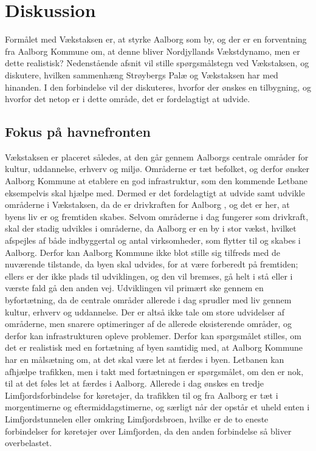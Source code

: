 \section{Diskussion}
 Formålet med Vækstaksen er, at styrke Aalborg som by, og der er en forventning fra Aalborg Kommune om, at denne bliver Nordjyllands Vækstdynamo, men er dette realistisk? Nedenstående afsnit vil stille spørgsmålstegn ved Vækstaksen, og diskutere, hvilken sammenhæng Strøybergs Palæ og Vækstaksen har med hinanden. I den forbindelse vil der diskuteres, hvorfor der ønskes en tilbygning, og hvorfor det netop er i dette område, det er fordelagtigt at udvide.

\subsection{Fokus på havnefronten}
Vækstaksen er placeret således, at den går gennem Aalborgs centrale områder for kultur, uddannelse, erhverv og miljø. Områderne er tæt befolket, og derfor ønsker Aalborg Kommune at etablere en god infrastruktur, som den kommende Letbane eksempelvis skal hjælpe med. Dermed er det fordelagtigt at udvide samt udvikle områderne i Vækstaksen, da de er drivkraften for Aalborg \citep{bedreoverblik}, og det er her, at byens liv er og fremtiden skabes. Selvom områderne i dag fungerer som drivkraft, skal der stadig udvikles i områderne, da Aalborg er en by i stor vækst, hvilket afspejles af både indbyggertal og antal virksomheder, som flytter til og skabes i Aalborg. Derfor kan Aalborg Kommune ikke blot stille sig tilfreds med de nuværende tilstande, da byen skal udvides, for at være forberedt på fremtiden; ellers er der ikke plads til udviklingen, og den vil bremses, gå helt i stå eller i værste fald gå den anden vej.
\newline \indent{     }  Udviklingen vil primært ske gennem en byfortætning, da de centrale områder allerede i dag sprudler med liv gennem kultur, erhverv og uddannelse. Der er altså ikke tale om store udvidelser af områderne, men snarere optimeringer af de allerede eksisterende områder, og derfor kan infrastrukturen opleve problemer. Derfor kan spørgsmålet stilles, om det er realistisk med en fortætning af byen samtidig med, at Aalborg Kommune har en målsætning om, at det skal være let at færdes i byen. Letbanen kan afhjælpe trafikken, men i takt med fortætningen er spørgsmålet, om den er nok, til at det føles let at færdes i Aalborg. Allerede i dag ønskes en tredje Limfjordsforbindelse for køretøjer, da trafikken til og fra Aalborg er tæt i morgentimerne og eftermiddagstimerne, og særligt når der opstår et uheld enten i Limfjordstunnelen eller omkring Limfjordsbroen, hvilke er de to eneste forbindelser for køretøjer over Limfjorden, da den anden forbindelse så bliver overbelastet. 
